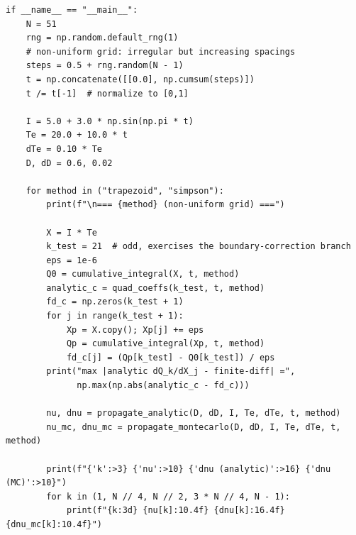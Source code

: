\documentclass[11pt,twoside]{article}
\begin{document}
\begin{lstlisting}[caption={Example implementation of the recession rate calculation in Python}]
if __name__ == "__main__":
    N = 51
    rng = np.random.default_rng(1)
    # non-uniform grid: irregular but increasing spacings
    steps = 0.5 + rng.random(N - 1)
    t = np.concatenate([[0.0], np.cumsum(steps)])
    t /= t[-1]  # normalize to [0,1]

    I = 5.0 + 3.0 * np.sin(np.pi * t)
    Te = 20.0 + 10.0 * t
    dTe = 0.10 * Te
    D, dD = 0.6, 0.02

    for method in ("trapezoid", "simpson"):
        print(f"\n=== {method} (non-uniform grid) ===")

        X = I * Te
        k_test = 21  # odd, exercises the boundary-correction branch
        eps = 1e-6
        Q0 = cumulative_integral(X, t, method)
        analytic_c = quad_coeffs(k_test, t, method)
        fd_c = np.zeros(k_test + 1)
        for j in range(k_test + 1):
            Xp = X.copy(); Xp[j] += eps
            Qp = cumulative_integral(Xp, t, method)
            fd_c[j] = (Qp[k_test] - Q0[k_test]) / eps
        print("max |analytic dQ_k/dX_j - finite-diff| =",
              np.max(np.abs(analytic_c - fd_c)))

        nu, dnu = propagate_analytic(D, dD, I, Te, dTe, t, method)
        nu_mc, dnu_mc = propagate_montecarlo(D, dD, I, Te, dTe, t, method)

        print(f"{'k':>3} {'nu':>10} {'dnu (analytic)':>16} {'dnu (MC)':>10}")
        for k in (1, N // 4, N // 2, 3 * N // 4, N - 1):
            print(f"{k:3d} {nu[k]:10.4f} {dnu[k]:16.4f} {dnu_mc[k]:10.4f}")
\end{lstlisting}
    
\end{document}
